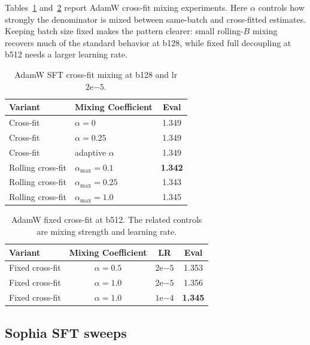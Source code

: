 \documentclass{article}
\newcommand{\best}[1]{\textbf{#1}}
\begin{document}
Tables~\ref{tab:app-alpha-b128} and~\ref{tab:app-alpha-b512} report AdamW cross-fit mixing experiments. Here $\alpha$ controls how strongly the denominator is mixed between same-batch and cross-fitted estimates. Keeping batch size fixed makes the pattern clearer: small rolling-$B$ mixing recovers much of the standard behavior at b128, while fixed full decoupling at b512 needs a larger learning rate.

\begin{table}[t]
\centering
\small
\setlength{\tabcolsep}{4pt}
\renewcommand{\arraystretch}{1.1}
\caption{AdamW SFT cross-fit mixing at b128 and lr $2\mathrm{e}{-5}$.}
\label{tab:app-alpha-b128}
\begin{tabular}{@{}llc@{}}
\toprule
\rowcolor{headergray}
\textbf{Variant} & \textbf{Mixing Coefficient} & \textbf{Eval} \\
\midrule
Cross-fit & $\alpha=0$ & 1.349 \\
Cross-fit & $\alpha=0.25$ & 1.349 \\
Cross-fit & adaptive $\alpha$ & 1.349 \\
Rolling cross-fit & $\alpha_{\max}=0.1$ & \best{1.342} \\
Rolling cross-fit & $\alpha_{\max}=0.25$ & 1.343 \\
Rolling cross-fit & $\alpha_{\max}=1.0$ & 1.345 \\
\bottomrule
\end{tabular}
\end{table}

\begin{table}[t]
\centering
\small
\setlength{\tabcolsep}{4pt}
\renewcommand{\arraystretch}{1.1}
\caption{AdamW fixed cross-fit at b512. The related controls are mixing strength and learning rate.}
\label{tab:app-alpha-b512}
\begin{tabular}{@{}lccc@{}}
\toprule
\rowcolor{headergray}
\textbf{Variant} & \textbf{Mixing Coefficient} & \textbf{LR} & \textbf{Eval} \\
\midrule
Fixed cross-fit & $\alpha=0.5$ & $2\mathrm{e}{-5}$ & 1.353 \\
Fixed cross-fit & $\alpha=1.0$ & $2\mathrm{e}{-5}$ & 1.356 \\
Fixed cross-fit & $\alpha=1.0$ & $1\mathrm{e}{-4}$ & \best{1.345} \\
\bottomrule
\end{tabular}
\end{table}

\subsection{Sophia SFT sweeps}
\end{document}
